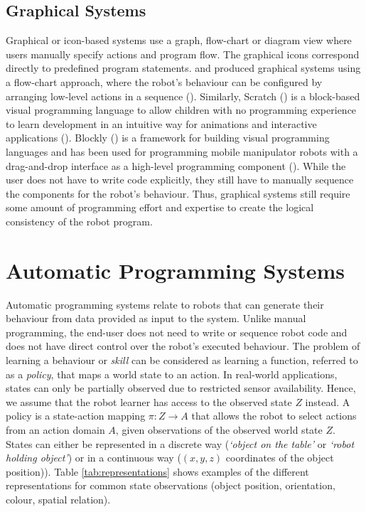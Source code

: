 \subsection{Graphical Systems}\label{sssec:Graphical systems}
Graphical or icon-based systems use a graph, flow-chart or diagram view where users manually specify actions and program flow.
The graphical icons correspond directly to predefined program statements.
\cite{lego2003} and \cite{bischoff2002morpha} produced graphical systems using a flow-chart approach, where the robot's behaviour can be configured by arranging low-level actions in a sequence ().
Similarly, Scratch (\cite{majed2014learn}) is a block-based visual programming language to allow children with no programming experience to learn development in an intuitive way for animations and interactive applications ().
Blockly (\cite{fraser2013blockly}) is a framework for building visual programming languages and has been used for programming mobile manipulator robots with a drag-and-drop interface as a high-level programming component (\cite{huang2016design}).
While the user does not have to write code explicitly, they still have to manually sequence the components for the robot's behaviour.
Thus, graphical systems still require some amount of programming effort and expertise to create the logical consistency of the robot program.
\section{Automatic Programming Systems}\label{subsec:Automatic Programming Systems}
Automatic programming systems relate to robots that can generate their behaviour from data provided as input to the system.
Unlike manual programming, the end-user does not need to write or sequence robot code and does not have direct control over the robot's executed behaviour.
The problem of learning a behaviour or \textit{skill} can be considered as learning a function, referred to as a \textit{policy}, that maps a world state to an action.
In real-world applications, states can only be partially observed due to restricted sensor availability.
Hence, we assume that the robot learner has access to the observed state $Z$ instead.
A policy is a state-action mapping $\pi : Z \rightarrow A$ that allows the robot to select actions from an action domain $A$, given observations of the observed world state $Z$.
States can either be represented in a discrete way (\eg \textit{`object on the table'} or \textit{`robot holding object'}) or in a continuous way (\eg $(x,y,z)$ coordinates of the object position)).
Table \ref{tab:representations} shows examples of the different representations for common state observations (\eg object position, orientation, colour, spatial relation).

